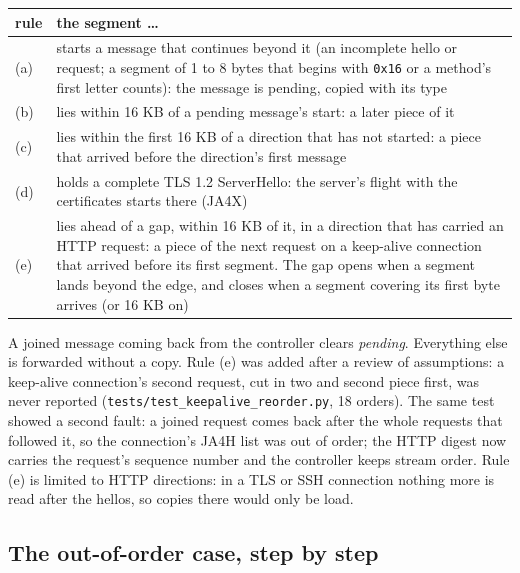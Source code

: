 \documentclass[11pt,a4paper]{article}
\newcommand{\code}[1]{\texttt{#1}}
\begin{document}
\begin{tabularx}{\textwidth}{l X}
\toprule
\textbf{rule} & \textbf{the segment \ldots} \\
\midrule
(a) & starts a message that continues beyond it (an incomplete hello or request; a segment of 1 to 8 bytes that
      begins with \code{0x16} or a method's first letter counts): the message is pending, copied with its type \\
(b) & lies within 16 KB of a pending message's start: a later piece of it \\
(c) & lies within the first 16 KB of a direction that has not started: a piece that arrived before the
      direction's first message \\
(d) & holds a complete TLS 1.2 ServerHello: the server's flight with the certificates starts there (JA4X) \\
(e) & lies ahead of a gap, within 16 KB of it, in a direction that has carried an HTTP request: a piece of the
      next request on a keep-alive connection that arrived before its first segment. The gap opens when a segment
      lands beyond the edge, and closes when a segment covering its first byte arrives (or 16 KB on) \\
\bottomrule
\end{tabularx}

A joined message coming back from the controller clears \emph{pending}. Everything else is forwarded without a copy.
Rule (e) was added after a review of assumptions: a keep-alive connection's second request, cut in two and second
piece first, was never reported (\code{tests/test\_keepalive\_reorder.py}, 18 orders). The same test showed a second
fault: a joined request comes back after the whole requests that followed it, so the connection's JA4H list was out
of order; the HTTP digest now carries the request's sequence number and the controller keeps stream order. Rule (e)
is limited to HTTP directions: in a TLS or SSH connection nothing more is read after the hellos, so copies there
would only be load.

\subsection{The out-of-order case, step by step}
\end{document}
